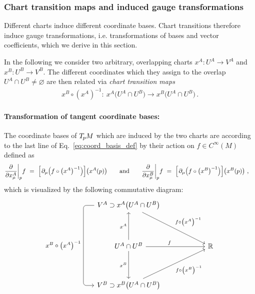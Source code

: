 \subsubsection{Chart transition maps and induced gauge transformations}
\label{apx:chart_transition_induced_gauge_trafos}

Different charts induce different coordinate bases.
Chart transitions therefore induce gauge transformations, i.e. transformations of bases and vector coefficients, which we derive in this section.

In the following we consider two arbitrary, overlapping charts $x^A: U^A \to V^A$ and $x^B: U^B\to V^B$.
The different coordinates which they assign to the overlap $U^A \cap U^B \neq \varnothing$ are then related via \emph{chart transition maps}
\begin{align}\label{eq:chart_transition_fct}
  x^B\circ\left(x^A\right)^{-1} \!:\ x^A\big(U^A\cap U^B\big)\to x^B\big(U^A\cap U^B\big) \,.
\end{align}



\paragraph{Transformation of tangent coordinate bases:}
The coordinate bases of $T_{\mkern-1.5mu p}\mkern-.5muM$ which are induced by the two charts are according to the last line of Eq.~\eqref{eq:coord_basis_def} by their action on $f \in C^\infty(M)$ defined as
\begin{align}
    \frac{\partial}{\partial x^A_\mu} \bigg|_p f
    \ =\ \Big[\mkern1.5mu \partial_\mu \pig(f \circ \big(x^A\big)^{-1} \pig)\Big] \big(x^A(p)\big)
    \qquad \text{and} \qquad
    \frac{\partial}{\partial x^B_\mu} \bigg|_p f
    \ =\ \Big[\mkern1.5mu \partial_\mu \pig(f \circ \big(x^B\big)^{-1} \pig)\Big] \big(x^B(p)\big) \ ,
    \quad
\end{align}
which is visualized by the following commutative diagram:
\begin{equation}\label{cd:scalar_field_chart_expressions}
    \begin{tikzcd}[row sep=4.em, column sep=6.em] %
        V^A \supset x^A \big( U^A \cap U^B \big)
                \arrow[rd, "
                    f\circ \big(x^A\big)^{-1}
                    "]
                \arrow[dd, rounded corners, to path={ 
                        -| node[left, pos=.75]{\small$x^B \circ \big(x^A\big)^{-1}$} ([xshift=-3.5ex]\tikztotarget.west)
                        -- (\tikztotarget.west)
                        }]
        \\
        U^A \cap U^B
                \arrow[r, pos=.4, "f"]
                \arrow[u, "x^A"]
                \arrow[d, "x^B"']
        &
        \R
        \\
        V^B \supset x^B \big( U^A \cap U^B \big)
                \arrow[ru, "
                    f\circ \big(x^B\big)^{-1}
                    "']
    \end{tikzcd}
\end{equation}

